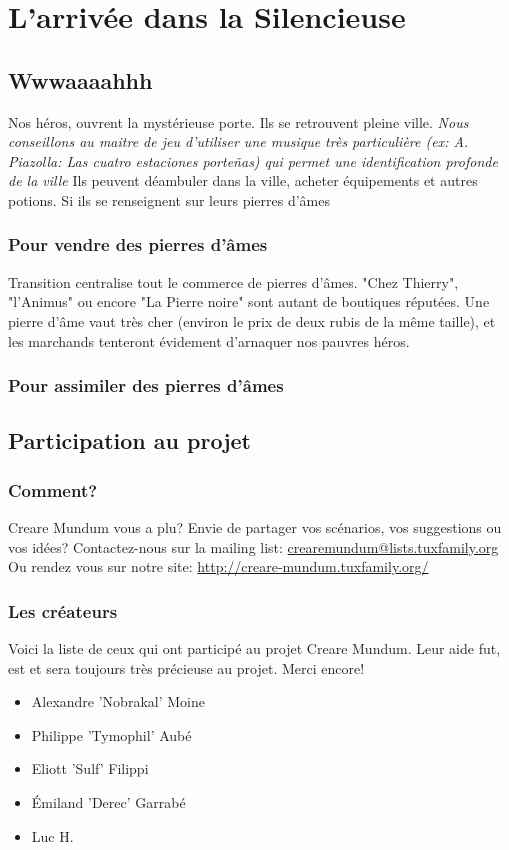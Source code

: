 \documentclass[a4paper, 11pt]{article}
\begin{document}
\chapter{L'arrivée dans la Silencieuse}
\section{Wwwaaaahhh}
Nos héros, ouvrent la mystérieuse porte. Ils se retrouvent pleine ville. \emph{Nous conseillons au maitre de jeu d'utiliser une musique très particulière (ex: A. Piazolla: Las cuatro estaciones porteñas) qui permet une identification profonde de la ville}
Ils peuvent déambuler dans la ville, acheter équipements et autres potions. Si ils se renseignent sur leurs pierres d'âmes
\subsection{Pour vendre des pierres d'âmes}
Transition centralise tout le commerce de pierres d'âmes. "Chez Thierry", "l'Animus" ou encore "La Pierre noire" sont autant de boutiques réputées. Une pierre d'âme vaut très cher (environ le prix de deux rubis de la même taille), et les marchands tenteront évidement d'arnaquer nos pauvres héros.
\subsection{Pour assimiler des pierres d'âmes}

\newpage
\section{Participation au projet}
\subsection{Comment?}
\hypertarget{participation}{}
Creare Mundum vous a plu? 
Envie de partager vos scénarios, vos suggestions ou vos idées?
\newline
Contactez-nous sur la mailing list: \href {mailto:crearemundum@lists.tuxfamily.org}{crearemundum@lists.tuxfamily.org}
\newline
Ou rendez vous sur notre site: \href {http://creare-mundum.tuxfamily.org/} {http://creare-mundum.tuxfamily.org/}
\subsection{Les créateurs}
Voici la liste de ceux qui ont participé au projet Creare Mundum. Leur aide fut, est et sera toujours très précieuse au projet. Merci encore!  
\begin{itemize}
\item Alexandre ’Nobrakal’ Moine 
\item Philippe ’Tymophil’ Aubé 
\item Eliott ’Sulf’ Filippi
\item Émiland ’Derec’ Garrabé
\item Luc H.
\end{itemize}
\end{document}
